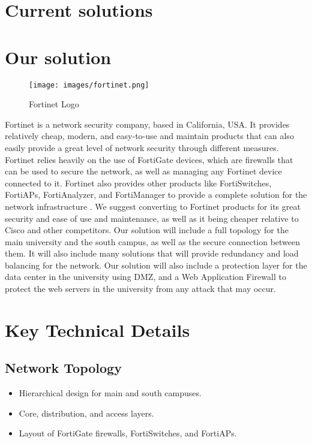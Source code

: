 \documentclass[12pt]{report}
\begin{document}
\section{Current solutions}
\section{Our solution}
\begin{figure}[h]
    \centering
    \texttt{[image: images/fortinet.png]}
    \caption{Fortinet Logo}
    \label{fig:fortinet logo}
\end{figure}
Fortinet is a network security company, based in California, USA. It provides relatively cheap, modern, and easy-to-use and maintain products that can also easily provide a great level of network security through different measures. Fortinet relies heavily on the use of FortiGate devices, which are firewalls that can be used to secure the network, as well as managing any Fortinet device connected to it. Fortinet also provides other products like FortiSwitches, FortiAPs, FortiAnalyzer, and FortiManager to provide a complete solution for the network infrastructure \cite{FortinetAbtus}. 
We suggest converting to Fortinet products for its great security and ease of use and maintenance, as well as it being cheaper relative to Cisco and other competitors. \cite{FNvsCISCO}
Our solution will include a full topology for the main university and the south campus, as well as the secure connection between them. It will also include many solutions that will provide redundancy and load balancing for the network.
Our solution will also include a protection layer for the data center in the university using DMZ, and a Web Application Firewall to protect the web servers in the university from any attack that may occur.

\section{Key Technical Details}
\subsection{Network Topology}
\begin{itemize}
    \item Hierarchical design for main and south campuses.
    \item Core, distribution, and access layers.
    \item Layout of FortiGate firewalls, FortiSwitches, and FortiAPs.
\end{itemize}
\end{document}
